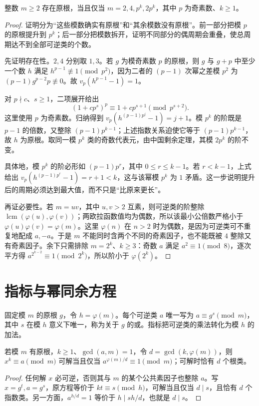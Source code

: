 \documentclass[UTF8,12pt,a4paper,fontset=fandol]{ctexbook}
\begin{document}
\begin{theorem}[原根分类]
\label{thm:primitive-root-classification}
整数 $m\ge2$ 存在原根，当且仅当 $m=2,4,p^k,2p^k$，其中 $p$ 为奇素数、$k\ge1$。
\end{theorem}
\begin{proof}
证明分为“这些模数确实有原根”和“其余模数没有原根”。前一部分把模 $p$ 的原根提升到 $p^k$；后一部分把模数拆开，证明不同部分的偶周期会重叠，使总周期达不到全部可逆类的个数。

先证明存在性。$2,4$ 分别取 $1,3$。若 $g$ 为模奇素数 $p$ 的原根，则 $g$ 与 $g+p$ 中至少一个数 $h$ 满足 $h^{p-1}\not\equiv1\pmod{p^2}$，因为二者的 $(p-1)$ 次幂之差模 $p^2$ 为 $(p-1)g^{p-2}p\not\equiv0$。故 $v_p(h^{p-1}-1)=1$。

对 $p\nmid c$、$s\ge1$，二项展开给出
\[
 (1+cp^s)^p\equiv1+cp^{s+1}\pmod{p^{s+2}}.
\]
这里使用 $p$ 为奇素数。归纳得到 $v_p(h^{(p-1)p^j}-1)=j+1$。模 $p^k$ 的阶既是 $p-1$ 的倍数，又整除 $(p-1)p^{k-1}$；上述指数关系迫使它等于 $(p-1)p^{k-1}$，故 $h$ 为原根。取同一模 $p^k$ 类的奇数代表元，由中国剩余定理，其模 $2p^k$ 的阶不变。

具体地，模 $p^k$ 的阶必形如 $(p-1)p^r$，其中 $0\le r\le k-1$。若 $r<k-1$，上式给出 $v_p(h^{(p-1)p^r}-1)=r+1<k$，这与该幂模 $p^k$ 为 $1$ 矛盾。这一步说明提升后的周期必须达到最大值，而不只是“比原来更长”。

再证必要性。若 $m=uv$，其中 $u,v>2$ 互素，则可逆类的阶整除 $\operatorname{lcm}(\varphi(u),\varphi(v))$；两欧拉函数值均为偶数，所以该最小公倍数严格小于 $\varphi(u)\varphi(v)=\varphi(m)$。这里 $\varphi(n)$ 在 $n>2$ 时为偶数，是因为可逆类可不重复地配成 $a,-a$。于是 $m$ 不能同时含两个不同的奇素因子，也不能既被 $4$ 整除又有奇素因子。余下只需排除 $m=2^k$、$k\ge3$：奇数 $a$ 满足 $a^2\equiv1\pmod8$，逐次平方得 $a^{2^{k-2}}\equiv1\pmod{2^k}$，所以阶小于 $\varphi(2^k)$。
\end{proof}

\section{指标与幂同余方程}

固定模 $m$ 的原根 $g$，令 $h=\varphi(m)$。每个可逆类 $a$ 唯一写为 $a\equiv g^s\pmod m$，其中 $s$ 在模 $h$ 意义下唯一，称为关于 $g$ 的或。指标把可逆类的乘法转化为模 $h$ 的加法。

\begin{proposition}
若模 $m$ 有原根，$k\ge1$、$\gcd(a,m)=1$，令 $d=\gcd(k,\varphi(m))$，则 $x^k\equiv a\pmod m$ 可解当且仅当 $a^{\varphi(m)/d}\equiv1\pmod m$；可解时恰有 $d$ 个根类。
\end{proposition}
\begin{proof}
任何解 $x$ 必可逆，否则其与 $m$ 的某个公共素因子也整除 $a$。写 $x=g^t,a=g^s$，原方程等价于 $kt\equiv s\pmod h$，可解当且仅当 $d\mid s$，且恰有 $d$ 个指数类。另一方面，$a^{h/d}=1$ 等价于 $h\mid sh/d$，也就是 $d\mid s$。
\end{proof}
\end{document}
